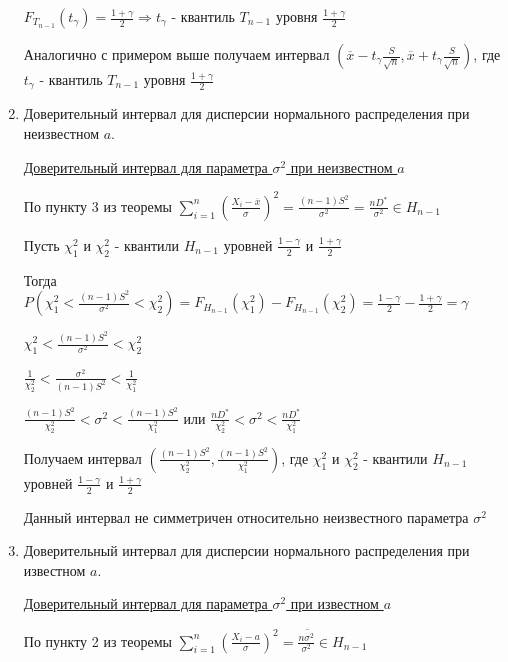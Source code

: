 \begin{enumerate}
    $F_{T_{n - 1}}(t_\gamma) = \frac{1 + \gamma}{2} \Longrightarrow t_\gamma$ - квантиль $T_{n - 1}$ уровня 
    $\frac{1 + \gamma}{2}$

    Аналогично с примером выше получаем интервал $\left(\overline{x} - t_\gamma \frac{S}{\sqrt{n}}, 
    \overline{x} + t_\gamma \frac{S}{\sqrt{n}}\right)$, 
    где $t_\gamma$ - квантиль $T_{n - 1}$ уровня $\frac{1 + \gamma}{2}$

    \item Доверительный интервал для дисперсии нормального распределения при неизвестном $a$.

    \hyperlink{confidence_interval_for_sigma_unknown_a}{Доверительный интервал для параметра $\sigma^2$ при неизвестном $a$}

    По пункту 3 из теоремы $\sum_{i = 1}^n \left(\frac{X_i - \overline{x}}{\sigma}\right)^2 = \frac{(n - 1)S^2}{\sigma^2} = 
    \frac{nD^*}{\sigma^2} \in H_{n - 1}$

    Пусть $\chi_1^2$ и $\chi_2^2$ - квантили $H_{n - 1}$ уровней $\frac{1 - \gamma}{2}$ и $\frac{1 + \gamma}{2}$

    Тогда $P\left(\chi_1^2 < \frac{(n - 1)S^2}{\sigma^2} < \chi_2^2\right) = F_{H_{n - 1}}(\chi_1^2) - F_{H_{n - 1}}(\chi_2^2) = \frac{1 - \gamma}{2} - \frac{1 + \gamma}{2} = \gamma$

    $\chi_1^2 < \frac{(n - 1)S^2}{\sigma^2} < \chi_2^2$

    $\frac{1}{\chi_2^2} < \frac{\sigma^2}{(n - 1)S^2} < \frac{1}{\chi_1^2}$

    $\frac{(n - 1)S^2}{\chi_2^2} < \sigma^2 < \frac{(n - 1)S^2}{\chi_1^2}$ или 
    $\frac{nD^*}{\chi_2^2} < \sigma^2 < \frac{nD^*}{\chi_1^2}$

    Получаем интервал $\left(\frac{(n - 1)S^2}{\chi_2^2}, \frac{(n - 1)S^2}{\chi_1^2}\right)$, где $\chi_1^2$ и $\chi_2^2$ - квантили $H_{n - 1}$ уровней $\frac{1 - \gamma}{2}$ и $\frac{1 + \gamma}{2}$

    \Nota Данный интервал не симметричен относительно неизвестного параметра $\sigma^2$

    \item Доверительный интервал для дисперсии нормального распределения при известном $a$.

    \hyperlink{confidence_interval_for_sigma_known_a}{Доверительный интервал для параметра $\sigma^2$ при известном $a$}

    По пункту 2 из теоремы $\sum_{i = 1}^n \left(\frac{X_i - a}{\sigma}\right)^2 = \frac{n \tilde{\sigma^2}}{\sigma^2} \in H_{n - 1}$
    

\end{enumerate}
